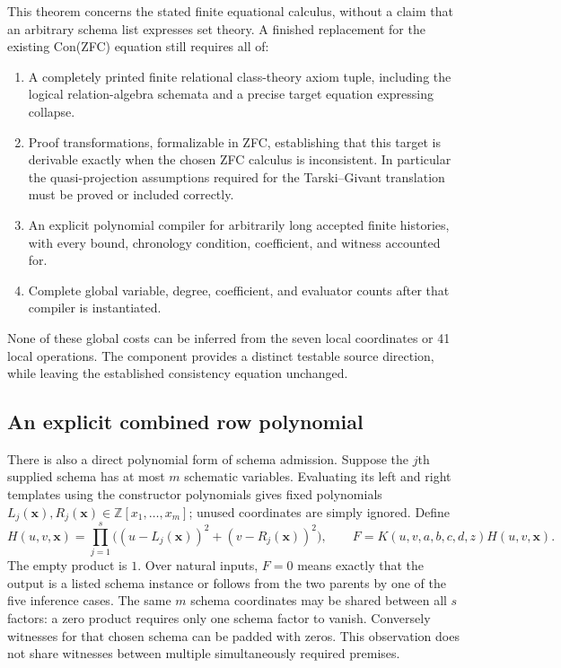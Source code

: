 This theorem concerns the stated finite equational calculus, without a
claim that an arbitrary schema list expresses set theory.  A finished
replacement for the existing Con(ZFC) equation still requires all of:
\begin{enumerate}
\item A completely printed finite relational class-theory axiom tuple,
including the logical relation-algebra schemata and a precise target
equation expressing collapse.
\item Proof transformations, formalizable in ZFC, establishing that this
target is derivable exactly when the chosen ZFC calculus is inconsistent.
In particular the quasi-projection assumptions required for the
Tarski--Givant translation must be proved or included correctly.
\item An explicit polynomial compiler for arbitrarily long accepted
finite histories, with every bound, chronology condition, coefficient,
and witness accounted for.
\item Complete global variable, degree, coefficient, and evaluator counts
after that compiler is instantiated.
\end{enumerate}
None of these global costs can be inferred from the seven local
coordinates or 41 local operations.  The component provides a distinct
testable source direction, while leaving the established consistency
equation unchanged.

\subsection{An explicit combined row polynomial}

There is also a direct polynomial form of schema admission.  Suppose
the $j$th supplied schema has at most $m$ schematic variables.  Evaluating
its left and right templates using the constructor polynomials gives
fixed polynomials $L_j(\mathbf x),R_j(\mathbf x)\in
\mathbb Z[x_1,\ldots,x_m]$; unused coordinates are simply ignored.
Define
\[
 H(u,v,\mathbf x)=\prod_{j=1}^{s}
 \bigl((u-L_j(\mathbf x))^2+(v-R_j(\mathbf x))^2\bigr),
 \qquad
 F=K(u,v,a,b,c,d,z)H(u,v,\mathbf x).
\]
The empty product is $1$.  Over natural inputs, $F=0$ means exactly
that the output is a listed schema instance or follows from the two
parents by one of the five inference cases.  The same $m$ schema
coordinates may be shared between all $s$ factors: a zero product
requires only one schema factor to vanish.  Conversely witnesses for
that chosen schema can be padded with zeros.  This observation does
not share witnesses between multiple simultaneously required premises.

